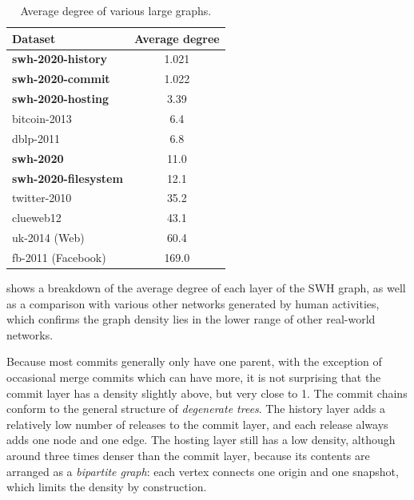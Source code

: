 \begin{table}
  \centering
  \caption{Average degree of various large graphs.}%
  \label{tab:degree-comparison}
  \begin{tabular}[t]{l S[table-format=3.3]}
      \textbf{Dataset} & \textbf{Average degree} \\
    \hline
    \textbf{swh-2020-history}    & 1.021 \\
    \textbf{swh-2020-commit}     & 1.022 \\
    \textbf{swh-2020-hosting}    & 3.39 \\
    bitcoin-2013~\cite{maesa2018data}                 & 6.4 \\
    dblp-2011                    & 6.8 \\
    \textbf{swh-2020}            & 11.0 \\
    \textbf{swh-2020-filesystem} & 12.1 \\
    twitter-2010~\cite{kwak2010twitter}      & 35.2 \\
    clueweb12                    & 43.1 \\
    uk-2014 (Web)~\cite{BMSB}               & 60.4 \\
    fb-2011 (Facebook)~\cite{backstrom2012four}          & 169.0 \\
  \end{tabular}
\end{table}

 shows a breakdown of the average degree of each
layer of the SWH graph, as well as a comparison with various other networks
generated by human activities, which confirms the graph density lies in the
lower range of other real-world networks.

Because most commits generally only have one parent, with the exception of
occasional merge commits which can have more, it is not surprising that the
commit layer has a density slightly above, but very close to 1. The commit
chains conform to the general structure of \emph{degenerate trees}. The history
layer adds a relatively low number of releases to the commit layer, and each
release always adds one node and one edge.
The hosting layer still has a low density, although around three times denser
than the commit layer, because its contents are arranged as a \emph{bipartite
graph}: each vertex connects one origin and one snapshot, which limits the
density by construction.

